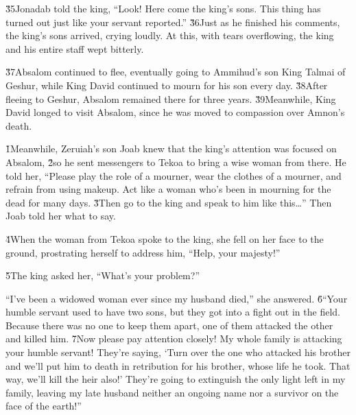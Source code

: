 \v{35}Jonadab told the king, ``Look! Here come the king's sons. This thing has turned out just like your servant reported.'' \v{36}Just as he finished his comments, the king's sons arrived, crying loudly. At this, with tears overflowing, the king and his entire staff wept bitterly.

\v{37}Absalom continued to flee, eventually going to Ammihud's son King Talmai of Geshur, while King David continued to mourn for his son every day. \v{38}After fleeing to Geshur, Absalom remained there for three years. \v{39}Meanwhile, King David longed to visit Absalom, since he was moved to compassion over Amnon's death.

\v{1}Meanwhile, Zeruiah's son Joab knew that the king's attention was focused on Absalom, \v{2}so he sent messengers to Tekoa to bring a wise woman from there. He told her, ``Please play the role of a mourner, wear the clothes of a mourner, and refrain from using makeup. Act like a woman who's been in mourning for the dead for many days. \v{3}Then go to the king and speak to him like this{\ldots}'' Then Joab told her what to say.

\v{4}When the woman from Tekoa spoke to the king, she fell on her face to the ground, prostrating herself to address him, ``Help, your majesty!''

\v{5}The king asked her, ``What's your problem?''

``I've been a widowed woman ever since my husband died,'' she answered. \v{6}``Your humble servant used to have two sons, but they got into a fight out in the field. Because there was no one to keep them apart, one of them attacked the other and killed him. \v{7}Now please pay attention closely! My whole family is attacking your humble servant! They're saying, `Turn over the one who attacked his brother and we'll put him to death in retribution for his brother, whose life he took. That way, we'll kill the heir also!' They're going to extinguish the only light left in my family, leaving my late husband neither an ongoing name nor a survivor on the face of the earth!''

